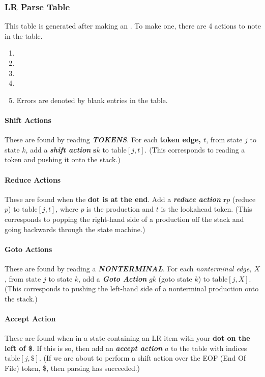 \subsubsection{LR Parse Table}\label{subsubsec:LRParseTable}
This table is generated after making an .
To make one, there are 4 actions to note in the table.
\begin{enumerate}[noitemsep]
\item {}
\item {}
\item {}
\item {}
\item Errors are denoted by blank entries in the table.
\end{enumerate}

\paragraph{Shift Actions}\label{par:ShiftActions}
These are found by reading \textbf{\emph{TOKENS}}.
For each \textbf{token edge, $t$}, from state $j$ to state $k$, add a \textbf{\emph{shift action}} $\mathbf{s} k$ to $\text{table}[j,t]$.
(This corresponds to reading a token and pushing it onto the stack.)

\paragraph{Reduce Actions}\label{par:ReduceActions}
These are found when the \textbf{dot is at the end}.
Add a \textbf{\emph{reduce action}} $\mathbf{r} p$ (reduce $p$) to $\text{table}[j,t]$, where $p$ is the production and $t$ is the lookahead token.
(This corresponds to popping the right-hand side of a production off the stack and going backwards through the state machine.)

\paragraph{Goto Actions}\label{par:GotoActions}
These are found by reading a \textbf{\emph{NONTERMINAL}}.
For each \emph{nonterminal edge, $X$}, from state $j$ to state $k$, add a \textbf{\emph{Goto Action}} $ g\mathbf{} k$ (goto state $k$) to $\text{table}[j,X]$.
(This corresponds to pushing the left-hand side of a nonterminal production onto the stack.)

\paragraph{Accept Action}\label{par:AcceptAction}
These are found when in a state containing an LR item with your \textbf{dot on the left of \$}.
If this is so, then add an \textbf{\emph{accept action}} $a$ to the table with indices $\text{table}[j,\$]$.
(If we are about to perform a shift action over the EOF (End Of File) token, \$, then parsing has succeeded.)

